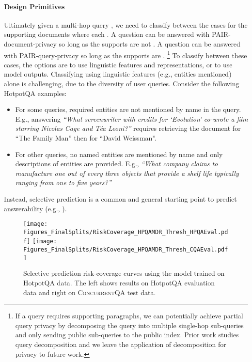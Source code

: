 \documentclass{article}
\renewcommand\cite{\citep}	\newcommand\shortcite{\citeyearpar}\newcommand\newcite{\citet}
\newcommand{\datasetname}{\textsc{ConcurrentQA}\xspace}
\newcommand{\problemshortname}{\textsc{PAIR}\xspace}
\begin{document}
\paragraph{Design Primitives}
 Ultimately given a multi-hop query , we need to classify between the cases for the  supporting documents where each . A question can be answered with \problemshortname-document-privacy so long as the supports are not . A question can be answered with \problemshortname-query-privacy so long as the supports are . \footnote{If a query requires  supporting paragraphs, we can potentially achieve partial query privacy by decomposing the query into multiple single-hop sub-queries and only sending public sub-queries to the public index. Prior work studies query decomposition \cite{min2019multihopdecomp, perez2020qadecomp, wolfson2020break} and we leave the application of decomposition for privacy to future work.}
 To classify between these cases, the options are to use linguistic features and representations, or to use model outputs. Classifying using linguistic features (e.g., entities mentioned) alone is challenging, due to the diversity of user queries. Consider the following HotpotQA examples:
\begin{itemize}
    \item For some queries, required entities are not mentioned by name in the query. E.g., answering \textit{``What screenwriter with credits for `Evolution' co-wrote a film starring Nicolas Cage and Téa Leoni?''} requires retrieving the document for ``The Family Man'' then for ``David Weissman''. 
    \item For other queries, no named entities are mentioned by name and only descriptions of entities are provided. E.g., \textit{``What company claims to manufacture one out of every three objects that provide a shelf life typically ranging from one to five years?''} 
\end{itemize}

Instead, selective prediction \cite{chow1975selectivepred, elyaniv2010selectivepred, geifman2017selectivepred} is a common and general starting point to predict answerability (e.g., \citet{rodriguez2019quizbowl, kamath2020selectiveqa, lewis2021paq}). 

\begin{figure}
    \centering
    \texttt{[image: Figures\_FinalSplits/RiskCoverage\_HPQAMDR\_Thresh\_HPQAEval.pdf]}
    \texttt{[image: Figures\_FinalSplits/RiskCoverage\_HPQAMDR\_Thresh\_CQAEval.pdf]}
    \caption[width=0.9\linewidth]{Selective prediction risk-coverage curves using the model trained on HotpotQA data. The left shows results on HotpotQA evaluation data and right on \datasetname test data.} 
    \label{fig:callibration}
\end{figure}
\end{document}
